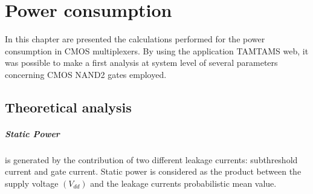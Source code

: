 \chapter{Power consumption}
In this chapter are presented the calculations performed for the power consumption in CMOS multiplexers. By using the application TAMTAMS web, it was possible to make a first analysis at system level of several parameters concerning CMOS NAND2 gates employed.  
\section{Theoretical analysis}
\paragraph{Static Power}
is generated by the contribution of two different leakage currents: subthreshold current and gate current.
Static power is considered as the product between the supply voltage $\left( V_{dd} \right)$  and the leakage currents probabilistic mean value.
\\
